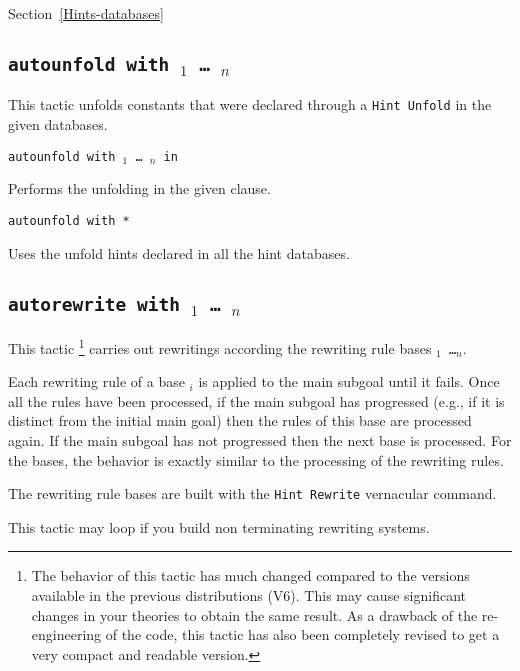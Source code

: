 \begin{coq_example*}
\SeeAlso Section~\ref{Hints-databases}

\subsection{\tt autounfold with \ident$_1$ \mbox{\dots} \ident$_n$}
\label{autounfold}

This tactic unfolds constants that were declared through a {\tt Hint
  Unfold} in the given databases.

\begin{Variants}
\item {\tt autounfold with \ident$_1$ \dots\ \ident$_n$ in }

  Performs the unfolding in the given clause.

\item {\tt autounfold with *}

  Uses the unfold hints declared in all the hint databases.
\end{Variants}


\subsection{\tt autorewrite with \ident$_1$ \mbox{\dots} \ident$_n$}
\label{tactic:autorewrite}

This tactic \footnote{The behavior of this tactic has much changed compared to
the versions available in the previous distributions (V6). This may cause
significant changes in your theories to obtain the same result. As a drawback
of the re-engineering of the code, this tactic has also been completely revised
to get a very compact and readable version.} carries out rewritings according
the rewriting rule bases {\tt \ident$_1$ \dots \ident$_n$}.

Each rewriting rule of a base \ident$_i$ is applied to the main subgoal until
it fails. Once all the rules have been processed, if the main subgoal has
progressed (e.g., if it is distinct from the initial main goal) then the rules
of this base are processed again. If the main subgoal has not progressed then
the next base is processed. For the bases, the behavior is exactly similar to
the processing of the rewriting rules.

The rewriting rule bases are built with the {\tt Hint~Rewrite} vernacular
command.

\Warning{} This tactic may loop if you build non terminating rewriting systems.


\end{coq_example*}
